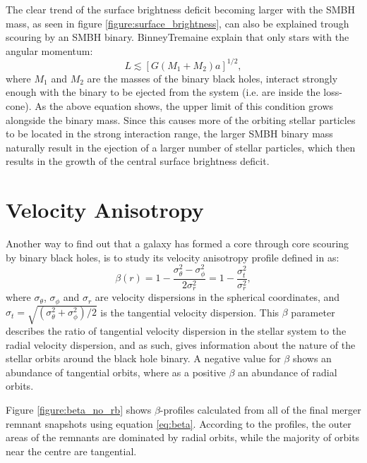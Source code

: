 \documentclass[english, oneside]{HYgradu}
\begin{document}
The clear trend of the surface brightness deficit becoming larger with the SMBH mass, as seen in figure \ref{figure:surface_brightness}, can also be explained trough scouring by an SMBH binary. \citep{Bender1994}{BinneyTremaine} explain that only stars with the angular momentum:
\begin{equation}
L \lesssim [G(M_1 + M_2)a]^{1/2},
\end{equation}
where $M_1$ and $M_2$ are the masses of the binary black holes, interact strongly enough with the binary to be ejected from the system (i.e. are inside the loss-cone). As the above equation shows, the upper limit of this condition grows alongside the binary mass. Since this causes more of the orbiting stellar particles to be located in the strong interaction range, the larger SMBH binary mass naturally result in the ejection of a larger number of stellar particles, which then results in the growth of the central surface brightness deficit.

\section{Velocity Anisotropy}


Another way to find out that a galaxy has formed a core through core scouring by binary black holes, is to study its velocity anisotropy profile defined in \cite{BinneyTremaine} as:
\begin{equation}
\beta(r) = 1 - \frac{\sigma_\theta^2 - \sigma_\phi^2}{2\sigma_r^2} = 1 - \frac{\sigma_t^2}{\sigma_r^2}, \label{eq:beta}
\end{equation}
where $\sigma_\theta$, $\sigma_\phi$ and $\sigma_r$ are velocity dispersions in the spherical coordinates, and $\sigma_t = \sqrt{(\sigma_\theta^2 + \sigma_\phi^2) / 2}$ is the tangential velocity dispersion. This $\beta$ parameter describes the ratio of tangential velocity dispersion in the stellar system to the radial velocity dispersion, and as such, gives information about the nature of the stellar orbits around the black hole binary. A negative value for $\beta$ shows an abundance of tangential orbits, where as a positive $\beta$ an abundance of radial orbits. 

Figure \ref{figure:beta_no_rb} shows $\beta$-profiles calculated from all of the final merger remnant snapshots using equation \ref{eq:beta}. According to the profiles, the outer areas of the remnants are dominated by radial orbits, while the majority of orbits near the centre are tangential.
\end{document}
